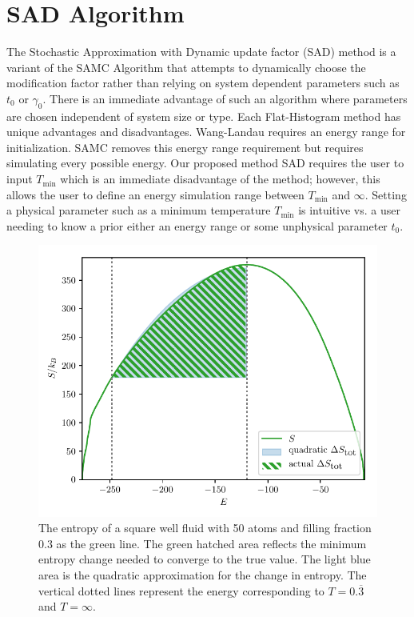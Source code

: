 \documentclass[letterpaper,twocolumn,amsmath,amssymb,pre,aps,10pt]{revtex4-1}
\begin{document}
\section{SAD Algorithm}\label{sec:sad}
The Stochastic Approximation with Dynamic update factor (SAD) method
is a variant of the SAMC
Algorithm that attempts to dynamically choose the modification factor
rather than relying on system dependent parameters such as $t_0$ or
$\gamma_0$.  There is an immediate advantage of such an algorithm where
parameters are chosen independent of system size or type. Each
Flat-Histogram method has unique advantages and disadvantages.
Wang-Landau requires an energy range for initialization.  SAMC removes
this energy range requirement but requires simulating every possible
energy. Our proposed method SAD requires the user to input
$T_\text{min}$ which is an immediate disadvantage of the method;
however, this allows the user to define an energy simulation
range between $T_\text{min}$ and $\infty$. Setting a physical parameter
such as a minimum temperature $T_\text{min}$ is intuitive vs. a user
needing to know a prior either an energy range or some unphysical
parameter $t_0$.

\begin{figure}
  \includegraphics[width=\columnwidth]{figs/N50-lndos-comparison}
  \caption{The entropy of a square well fluid with 50 atoms and filling fraction
        0.3 as the green line.  The green hatched area reflects the
        minimum entropy change needed to converge to the true value.
        The light blue area is the quadratic approximation
        for the change in entropy.  The vertical dotted lines represent
        the energy corresponding to $T=0.\overline{3}$ and $T=\infty$.}
\end{figure}
\end{document}

